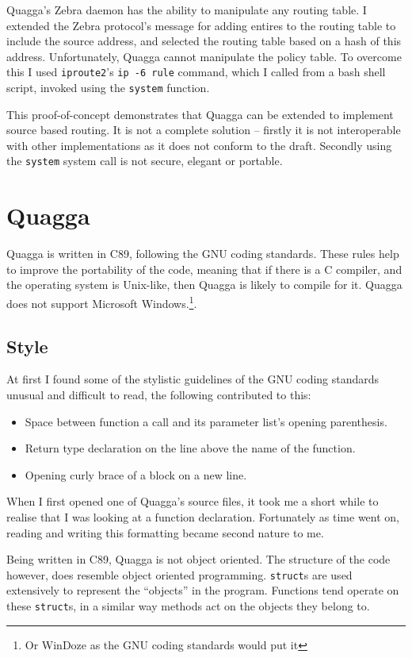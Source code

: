 \documentclass[12pt,a4paper,twoside]{report}
\begin{document}
Quagga's Zebra daemon has the ability to manipulate any routing table. I
extended the Zebra protocol's message for adding entires to the routing table
to include the source address, and selected the routing table based on a hash
of this address. Unfortunately, Quagga cannot manipulate the policy table. To
overcome this I used \texttt{iproute2}'s \texttt{ip -6 rule} command, which I
called from a bash shell script, invoked using the \texttt{system} function. 

This proof-of-concept demonstrates that Quagga can be extended to implement
source based routing. It is not a complete solution -- firstly it is not
interoperable with other implementations as it does not conform to the draft.
Secondly using the \texttt{system} system call is not secure, elegant or
portable. 

\section{Quagga}
Quagga is written in C89, following the GNU coding
standards\cite{gnucodestandards}. These rules help to improve the portability
of the code, meaning that if there is a C compiler, and the operating system is
Unix-like, then Quagga is likely to compile for it.  Quagga does not
support Microsoft Windows.\footnote{Or WinDoze as the GNU coding standards would
put it}.

\subsection{Style}
At first I found some of the stylistic guidelines of the GNU coding standards
unusual and difficult to read, the following contributed to this:
\begin{itemize} 
  \item Space between function a call and its parameter list's opening parenthesis.
  \item Return type declaration on the line above the name of the function.  
  \item Opening curly brace of a block on a new line.
\end{itemize}

When I first opened one of Quagga's source files, it took me a short while to
realise that I was looking at a function declaration. Fortunately as time went
on, reading and writing this formatting became second nature to me. 

Being written in C89, Quagga is not object oriented. The structure of the code
however, does resemble object oriented programming. \texttt{struct}s are used
extensively to represent the ``objects'' in the program. Functions tend operate
on these \texttt{struct}s, in a similar way methods act on the objects
they belong to.
\end{document}
